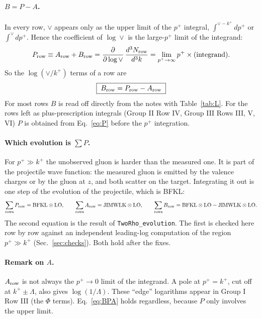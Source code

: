 \documentclass[10pt]{article}
\numberwithin{equation}{section}
\newcommand{\kp}{k^+}
\newcommand{\pp}{p^+}
\begin{document}
\paragraph{$B=P-A$.} In every row, $\vee$ appears only as the upper limit of the $\pp$ integral, $\int^{\vee-k^+}d\pp$ or $\int^{\vee}d\pp$. Hence the coefficient of $\log\vee$ is the large-$\pp$ limit of the integrand:
\begin{equation}
P_{\rm row}\equiv A_{\rm row}+B_{\rm row}=\frac{\partial}{\partial\log\vee}\,\frac{d^3N_{\rm row}}{d^3k}=\lim_{\pp\to\infty}\pp\times(\text{integrand}).
\label{eq:P}
\end{equation}
So the $\log(\vee/k^+)$ terms of a row are
\begin{equation}
\boxed{\;B_{\rm row}=P_{\rm row}-A_{\rm row}\;}
\label{eq:BPA}
\end{equation}
For most rows $B$ is read off directly from the notes with Table~\ref{tab:L}. For the rows left as plus-prescription integrals (Group II Row IV, Group III Rows III, V, VI) $P$ is obtained from Eq.~\eqref{eq:P} before the $\pp$ integration.

\paragraph{Which evolution is $\sum P$.} For $\pp\gg\kp$ the unobserved gluon is harder than the measured one. It is part of the projectile wave function: the measured gluon is emitted by the valence charges or by the gluon at $z$, and both scatter on the target. Integrating it out is one step of the evolution of the projectile, which is BFKL:
\begin{equation}
\sum_{\rm rows}P_{\rm row}=\text{BFKL}\otimes\text{LO},\qquad\sum_{\rm rows}A_{\rm row}=\text{JIMWLK}\otimes\text{LO},\qquad
\sum_{\rm rows}B_{\rm row}=\text{BFKL}\otimes\text{LO}-\text{JIMWLK}\otimes\text{LO}.
\label{eq:sums}
\end{equation}
The second equation is the result of \texttt{TwoRho\_evolution}. The first is checked here row by row against an independent leading-log computation of the region $\pp\gg\kp$ (Sec.~\ref{sec:checks}). Both hold after the fixes.

\paragraph{Remark on $A$.} $A_{\rm row}$ is not always the $\pp\to0$ limit of the integrand. A pole at $\pp=\kp$, cut off at $\kp\pm\Lambda$, also gives $\log(1/\Lambda)$. These ``edge'' logarithms appear in Group I Row III (the $\Phi$ terms). Eq.~\eqref{eq:BPA} holds regardless, because $P$ only involves the upper limit.
\end{document}
